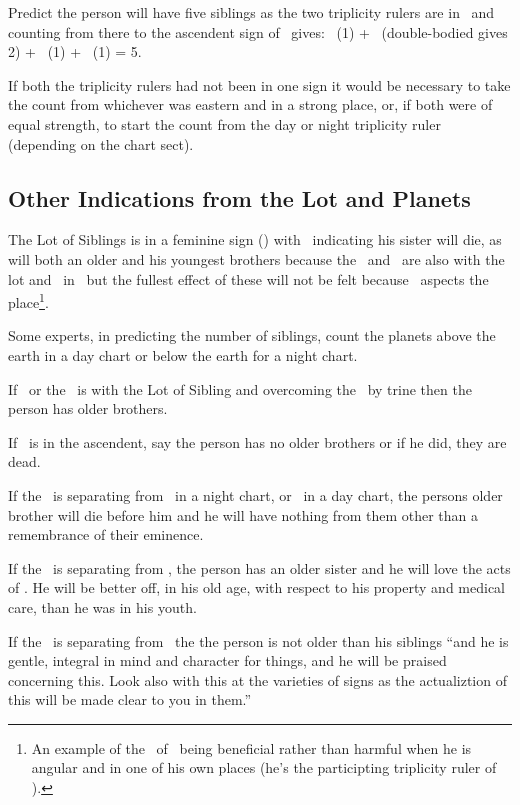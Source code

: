 Predict the person will have five siblings as the two triplicity rulers are in \Taurus\, and counting from there to the ascendent sign of \Leo\, gives: \Taurus\, (1) + \Gemini\, (double-bodied gives 2) + \Cancer\, (1) + \Leo\, (1) = 5.

If both the triplicity rulers had not been in one sign it would be necessary to take the count from whichever was eastern and in a strong place, or, if both were of equal strength, to start the count from the day or night triplicity ruler (depending on the chart sect). 

\subsection{Other Indications from the Lot and Planets}
The Lot of Siblings is in a feminine sign (\Taurus) with \Saturn\, indicating his sister will die, as will both an older and his youngest brothers because the \Sun\, and \Mercury\, are also with the lot and \Saturn\, in \Taurus\, but the fullest effect of these will not be felt because \Jupiter\, aspects the place\footnote{An example of the \Square\, of \Jupiter\, being beneficial rather than harmful when he is angular and in one of his own places (he's the participting triplicity ruler of \Aquarius).}.

Some experts, in predicting the number of siblings, count the planets above the earth in a day chart or below the earth for a night chart. 

If \Jupiter\, or the \Sun\, is with the Lot of Sibling and overcoming the \Moon\, by trine then the person has older brothers.

If \Mercury\, is in the ascendent, say the person has no older brothers or if he did, they are dead.

If the \Moon\, is separating from \Saturn\, in a night chart,  or \Mars\, in a day chart, the persons older brother will die before him and he will have nothing from them other than a remembrance of their eminence.

If the \Moon\, is separating from \Venus, the person has an older sister and he will love the acts of \Venus. He will be better off, in his old age, with respect to his property and medical care,  than he was in his youth.

If the \Moon\, is separating from \Mercury\, the the person is not older than his siblings ``and he is gentle, integral in mind and character for things, and he will be praised concerning this. Look also with this at the varieties of signs as the actualiztion of this will be made clear to you in them.''

